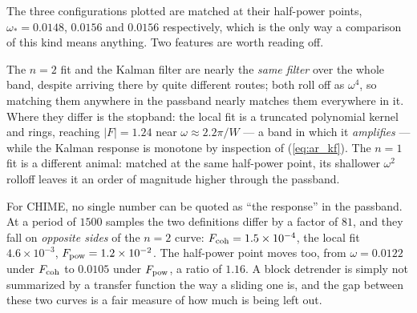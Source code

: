 \documentclass{article}
\numberwithin{equation}{section}   %
\begin{document}
The three configurations plotted are matched at their half-power points, $\omega_* = 0.0148$, $0.0156$ and
$0.0156$ respectively, which is the only way a comparison of this kind means anything.  Two features are
worth reading off.

The $n=2$ fit and the Kalman filter are nearly the {\em same filter} over the whole band, despite arriving
there by quite different routes; both roll off as $\omega^4$, so matching them anywhere in the passband
nearly matches them everywhere in it.  Where they differ is the stopband: the local fit is a truncated
polynomial kernel and rings, reaching $|F| = 1.24$ near $\omega \approx 2.2\pi/W$ --- a band in which it
{\em amplifies} --- while the Kalman response is monotone by inspection of (\ref{eq:ar_kf}).  The $n=1$ fit
is a different animal: matched at the same half-power point, its shallower $\omega^2$ rolloff leaves it an
order of magnitude higher through the passband.

For CHIME, no single number can be quoted as ``the response'' in the passband.  At a period of $1500$
samples the two definitions differ by a factor of $81$, and they fall on {\em opposite sides} of the $n=2$
curve: $F_{\rm coh} = 1.5\times10^{-4}$, the local fit $4.6\times10^{-3}$, $F_{\rm pow} = 1.2\times10^{-2}$.
The half-power point moves too, from $\omega = 0.0122$ under $F_{\rm coh}$ to $0.0105$ under $F_{\rm pow}$,
a ratio of $1.16$.  A block detrender is simply not summarized by a transfer function the way a sliding one
is, and the gap between these two curves is a fair measure of how much is being left out.

\clearpage
\end{document}
